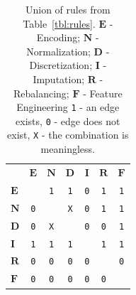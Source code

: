 \begin{example}
\begin{table}[b]
	\caption{
		Union of rules from Table~\ref{tbl:rules}. $\boldsymbol{E}$ - Encoding; $\boldsymbol{N}$ - Normalization; $\boldsymbol{D}$ - Discretization; $\boldsymbol{I}$ - Imputation; $\boldsymbol{R}$ - Rebalancing; $\boldsymbol{F}$ - Feature Engineering \texttt{1} - an edge exists, \texttt{0} - edge does not exist, \texttt{X} - the combination is meaningless.
	}
	\renewcommand{\arraystretch}{0.3}
	\footnotesize
	\centering
	\label{tbl:rules-union}
	\begin{threeparttable}
		\begin{tabular}{@{}lcccccc}
			\toprule
			& $\boldsymbol{E}$ & $\boldsymbol{N}$ & $\boldsymbol{D}$ & $\boldsymbol{I}$ & $\boldsymbol{R}$ & $\boldsymbol{F}$
			\\	\cmidrule[.1em]{1-7}
			$\boldsymbol{E}$ & \cellcolor{gray!25} & \texttt{1} & \texttt{1} & \texttt{0} & \texttt{1} & \texttt{1} \\	\cmidrule[.1em]{1-7}
			$\boldsymbol{N}$ & \texttt{0} & \cellcolor{gray!25}  & \texttt{X} & \texttt{0} & \texttt{1} & \texttt{1} \\	\cmidrule[.1em]{1-7}
			$\boldsymbol{D}$ & \texttt{0} & \texttt{X} & \cellcolor{gray!25} & \texttt{0} & \texttt{0} & \texttt{1} \\	\cmidrule[.1em]{1-7}
			$\boldsymbol{I}$ & \texttt{1} & \texttt{1} & \texttt{1} & \cellcolor{gray!25}  & \texttt{1} & \texttt{1} \\	\cmidrule[.1em]{1-7}
			$\boldsymbol{R}$ & \texttt{0} & \texttt{0} & \texttt{0} & \texttt{0} & \cellcolor{gray!25}  & \texttt{0} \\	\cmidrule[.1em]{1-7}
			$\boldsymbol{F}$ & \texttt{0} & \texttt{0} & \texttt{0} & \texttt{0} & \texttt{0} & \cellcolor{gray!25} \\	\cmidrule[.1em]{1-7}
		\end{tabular}
	\end{threeparttable}
\end{table}


\end{example}
